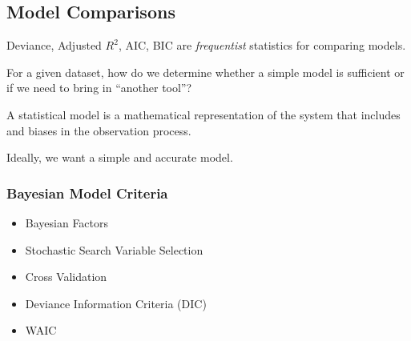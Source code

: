 \documentclass[11pt]{article}
\begin{document}
\subsection{Model Comparisons}
\label{sec:orga080515}

Deviance, Adjusted \(R^2\), AIC, BIC are \emph{frequentist} statistics for comparing
models.

For a given dataset, how do we determine whether a simple model is sufficient or
if we need to bring in ``another tool''?

A statistical model is a mathematical representation of the system that includes
and biases in the observation process.

Ideally, we want a simple and accurate model.

\subsubsection{Bayesian Model Criteria}
\label{sec:org50ac522}

\begin{itemize}
\item Bayesian Factors
\item Stochastic Search Variable Selection
\item Cross Validation
\item Deviance Information Criteria (DIC)
\item WAIC
\end{itemize}
\end{document}
